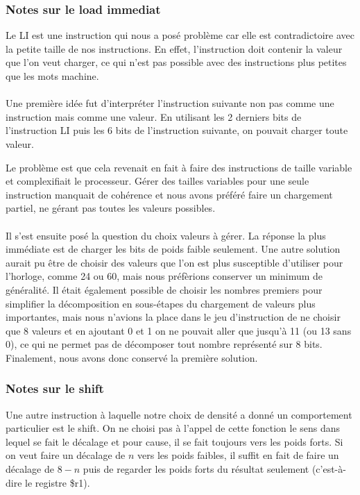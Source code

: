 \documentclass{article}
\begin{document}
\subsubsection{Notes sur le load immediat}
Le LI est une instruction qui nous a posé problème car elle est contradictoire
avec la petite taille de nos instructions. En effet, l'instruction doit contenir
la valeur que l'on veut charger, ce qui n'est pas possible avec des instructions
plus petites que les mots machine.

\paragraph{}
Une première idée fut d'interpréter l'instruction suivante non pas comme une
instruction mais comme une valeur. En utilisant les 2 derniers bits de l'instruction
LI puis les 6 bits de l'instruction suivante, on pouvait charger toute valeur.

Le problème est que cela revenait en fait à faire des instructions de taille variable
et complexifiait le processeur. Gérer des tailles variables pour une seule instruction
manquait de cohérence et nous avons préféré faire un chargement partiel, ne gérant
pas toutes les valeurs possibles.

\paragraph{}
Il s'est ensuite posé la question du choix valeurs à gérer. La réponse la plus immédiate
est de charger les bits de poids faible seulement. Une autre solution aurait
pu être de choisir des valeurs que l'on est plus susceptible d'utiliser pour l'horloge,
comme 24 ou 60, mais nous préfèrions conserver un minimum de généralité. Il était
également possible de choisir les nombres premiers pour simplifier la décomposition
en sous-étapes du chargement de valeurs plus importantes, mais nous n'avions la place
dans le jeu d'instruction de ne choisir que 8 valeurs et en ajoutant 0 et 1 on ne
pouvait aller que jusqu'à 11 (ou 13 sans 0), ce qui ne permet pas de décomposer
tout nombre représenté sur 8 bits. Finalement, nous avons donc conservé la première
solution.

\subsubsection{Notes sur le shift}
Une autre instruction à laquelle notre choix de densité a donné un comportement
particulier est le shift. On ne choisi pas à l'appel de cette fonction le sens dans
lequel se fait le décalage et pour cause, il se fait toujours vers les poids forts.
Si on veut faire un décalage de $n$ vers les poids faibles, il suffit en fait de
faire un décalage de $8 - n$ puis de regarder les poids forts du résultat seulement
(c'est-à-dire le registre \$r1).
\end{document}
